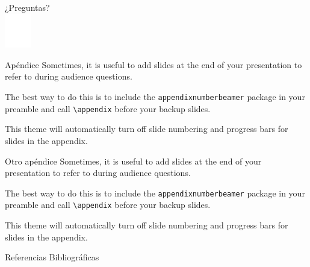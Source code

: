 \documentclass[10pt]{beamer}
\begin{document}
\begin{frame}[standout]
  ¿Preguntas? \\
  \includegraphics[height=1.5cm]{images/logos/logo-onlyescudo-usach-white.pdf}
\end{frame}

\appendix

\begin{frame}[fragile]{Apéndice}
  Sometimes, it is useful to add slides at the end of your presentation to
  refer to during audience questions.

  The best way to do this is to include the \verb|appendixnumberbeamer|
  package in your preamble and call \verb|\appendix| before your backup slides.

  This theme will automatically turn off slide numbering and progress bars for slides in the appendix.
\end{frame}

\begin{frame}[fragile]{Otro apéndice}
  Sometimes, it is useful to add slides at the end of your presentation to
  refer to during audience questions.

  The best way to do this is to include the \verb|appendixnumberbeamer|
  package in your preamble and call \verb|\appendix| before your backup slides.

  This theme will automatically turn off slide numbering and progress bars for slides in the appendix.
\end{frame}

\begin{frame}[allowframebreaks]{Referencias Bibliográficas}
  
  
\end{frame}
\end{document}
